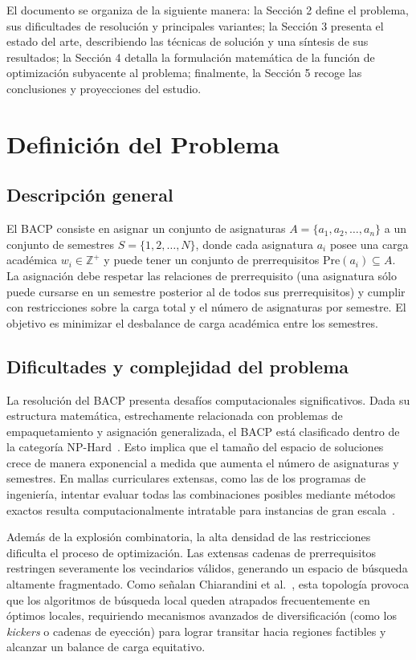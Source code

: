 \documentclass[letter, 10pt]{article}
\begin{document}
El documento se organiza de la siguiente manera: la Secci\'{o}n 2 define el problema, sus dificultades de resoluci\'{o}n y principales variantes; la Secci\'{o}n 3 presenta el estado del arte, describiendo las t\'{e}cnicas de soluci\'{o}n y una s\'{i}ntesis de sus resultados; la Secci\'{o}n 4 detalla la formulaci\'on matem\'atica de la funci\'on de optimizaci\'on subyacente al problema; finalmente, la Secci\'{o}n 5 recoge las conclusiones y proyecciones del estudio.


\section{Definici\'on del Problema}

\subsection{Descripci\'on general}
El BACP consiste en asignar un conjunto de asignaturas $A = \{a_1, a_2, \dots, a_n\}$ a un conjunto de semestres $S = \{1, 2, \dots, N\}$, donde cada asignatura $a_i$ posee una carga acad\'emica $w_i \in \mathbb{Z}^+$ y puede tener un conjunto de prerrequisitos $\text{Pre}(a_i) \subseteq A$. La asignaci\'on debe respetar las relaciones de prerrequisito (una asignatura s\'olo puede cursarse en un semestre posterior al de todos sus prerrequisitos) y cumplir con restricciones sobre la carga total y el n\'umero de asignaturas por semestre. El objetivo es minimizar el desbalance de carga acad\'emica entre los semestres.


\subsection{Dificultades y complejidad del problema}
La resoluci\'{o}n del BACP presenta desaf\'{i}os computacionales significativos. Dada su estructura matem\'{a}tica, estrechamente relacionada con problemas de empaquetamiento y asignaci\'{o}n generalizada, el BACP est\'{a} clasificado dentro de la categor\'{i}a NP-Hard~\cite{Castro2001}. Esto implica que el tama\~{n}o del espacio de soluciones crece de manera exponencial a medida que aumenta el n\'{u}mero de asignaturas y semestres. En mallas curriculares extensas, como las de los programas de ingenier\'{i}a, intentar evaluar todas las combinaciones posibles mediante m\'{e}todos exactos resulta computacionalmente intratable para instancias de gran escala~\cite{Chiarandini2012}. 

Adem\'{a}s de la explosi\'{o}n combinatoria, la alta densidad de las restricciones dificulta el proceso de optimizaci\'{o}n. Las extensas cadenas de prerrequisitos restringen severamente los vecindarios v\'{a}lidos, generando un espacio de b\'{u}squeda altamente fragmentado. Como se\~{n}alan Chiarandini et al.~\cite{Chiarandini2012}, esta topolog\'{i}a provoca que los algoritmos de b\'{u}squeda local queden atrapados frecuentemente en \'{o}ptimos locales, requiriendo mecanismos avanzados de diversificaci\'{o}n (como los \textit{kickers} o cadenas de eyecci\'{o}n) para lograr transitar hacia regiones factibles y alcanzar un balance de carga equitativo.
\end{document}
